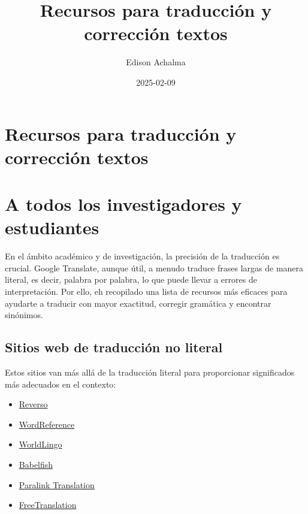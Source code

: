 \documentclass[
  jou,
  floatsintext,
  longtable,
  a4paper,
  nolmodern,
  notxfonts,
  notimes,
  12pt,
  colorlinks=true,linkcolor=blue,citecolor=blue,urlcolor=blue]{apa7}
\title{Recursos para traducción y corrección textos}
\author{Edison Achalma}
\affiliation{
{Escuela Profesional de Economía, Universidad Nacional de San Cristóbal
de Huamanga}}
\date{2025-02-09}
\providecommand{\tightlist}{%
  \setlength{\itemsep}{0pt}\setlength{\parskip}{0pt}}
\begin{document}
\maketitle


\hypertarget{toc}{}
\tableofcontents
\newpage
\section[Introduction]{Recursos para traducción y corrección textos}

\setcounter{secnumdepth}{3}

\setlength\LTleft{0pt}




\section{A todos los investigadores y
estudiantes}\label{a-todos-los-investigadores-y-estudiantes}

En el ámbito académico y de investigación, la precisión de la traducción
es crucial. Google Translate, aunque útil, a menudo traduce frases
largas de manera literal, es decir, palabra por palabra, lo que puede
llevar a errores de interpretación. Por ello, eh recopilado una lista de
recursos más eficaces para ayudarte a traducir con mayor exactitud,
corregir gramática y encontrar sinónimos.

\subsection{Sitios web de traducción no
literal}\label{sitios-web-de-traducciuxf3n-no-literal}

Estos sitios van más allá de la traducción literal para proporcionar
significados más adecuados en el contexto:

\begin{itemize}
\tightlist
\item
  \href{http://mobile.reverso.net/en}{Reverso}
\item
  \href{https://www.wordreference.com/}{WordReference}
\item
  \href{http://www.worldlingo.com/}{WorldLingo}
\item
  \href{https://www.babelfish.com/}{Babelfish}
\item
  \href{http://translation2.paralink.com/}{Paralink Translation}
\item
  \href{https://www.freetranslation.com/}{FreeTranslation}
\end{itemize}
\end{document}
